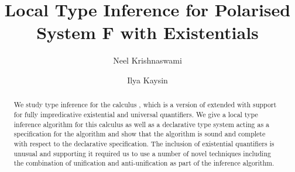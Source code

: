 \documentclass[acmsmall,natbib=false,review,anonymous]{acmart}
\begin{document}
\title{Local Type Inference for Polarised System F with Existentials}

\author{Neel Krishnaswami}

\author{Ilya Kaysin}


\renewcommand{\shortauthors}{Trovato et al.}

\begin{abstract}
    We study type inference for the calculus \fexists, which is a version of
    \CBPV extended with support for fully impredicative existential and universal 
    quantifiers. We give a local type inference algorithm for this calculus
    as well as a declarative type system acting as a specification for the algorithm
    and show that the algorithm is sound and complete with respect to the declarative
    specification. The inclusion of existential quantifiers is unusual and supporting it
    required us to use a number of novel techniques including the
    combination of unification and anti-unification as part of the inference algorithm.



\end{abstract}
\end{document}
